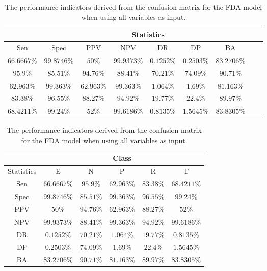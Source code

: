 \begin{table}[!ht]
	\centering
	\begin{tabular}{|c|c|c|c|c|c|c|c|c|}
		\hline
		 & \multicolumn{7}{c|}{Statistics} \\ \hline
		Sen & Spec & PPV & NPV & DR & DP & BA \\ \hline
		$66.6667\%$ & $99.8746\%$ & $50\%$ & $99.9373\%$ & $0.1252\%$ & $0.2503\%$ & $83.2706\%$ \\ \hline
		$95.9\%$ & $85.51\%$ & $94.76\%$ & $88.41\%$ & $70.21\%$ & $74.09\%$ & $90.71\%$ \\ \hline
		$62.963\%$ & $99.363\%$ & $62.963\%$ & $99.363\%$ & $1.064\%$ & $1.69\%$ & $81.163\%$ \\ \hline
		$83.38\%$ & $96.55\%$ & $88.27\%$ & $94.92\%$ & $19.77\%$ & $22.4\%$ & $89.97\%$ \\ \hline
		$68.4211\%$ & $99.24\%$ & $52\%$ & $99.6186\%$ & $0.8135\%$ & $1.5645\%$ & $83.8305\%$ \\ \hline
	\end{tabular}
	\caption{The performance indicators derived from the confusion matrix for the FDA model when using all variables as input.}
	\label{tab:cs:all:fda}
\end{table}

\begin{table}[!ht]
	\centering
	\begin{tabular}{|c|c|c|c|c|c|}
		\hline
		 & \multicolumn{5}{c|}{Class} \\ \hline
		Statistics & E & N & P & R & T \\ \hline
		Sen & $66.6667\%$ & $95.9\%$ & $62.963\%$ & $83.38\%$ & $68.4211\%$ \\ \hline
		Spec & $99.8746\%$ & $85.51\%$ & $99.363\%$ & $96.55\%$ & $99.24\%$ \\ \hline
		PPV & $50\%$ & $94.76\%$ & $62.963\%$ & $88.27\%$ & $52\%$ \\ \hline
		NPV & $99.9373\%$ & $88.41\%$ & $99.363\%$ & $94.92\%$ & $99.6186\%$ \\ \hline
		DR & $0.1252\%$ & $70.21\%$ & $1.064\%$ & $19.77\%$ & $0.8135\%$ \\ \hline
		DP & $0.2503\%$ & $74.09\%$ & $1.69\%$ & $22.4\%$ & $1.5645\%$ \\ \hline
		BA & $83.2706\%$ & $90.71\%$ & $81.163\%$ & $89.97\%$ & $83.8305\%$ \\ \hline
	\end{tabular}
	\caption{The performance indicators derived from the confusion matrix for the FDA model when using all variables as input.}
	\label{tab:cs:reverse:all:fda}
\end{table}

